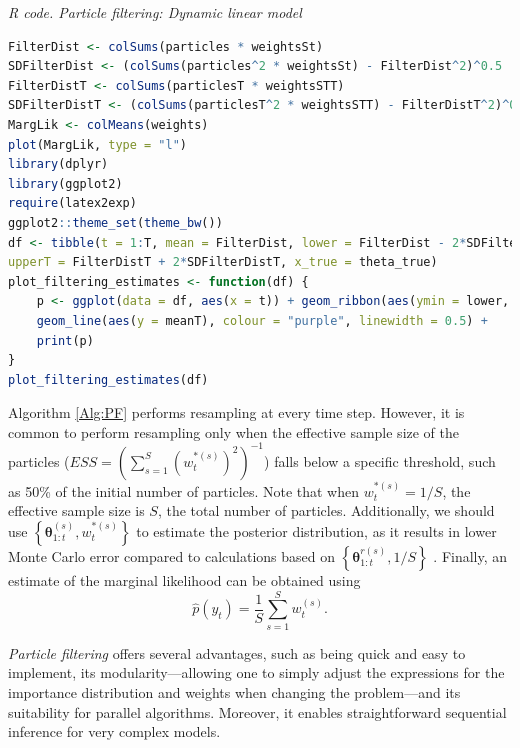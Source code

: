 \begin{tcolorbox}[enhanced,width=4.67in,center upper,
	fontupper=\large\bfseries,drop shadow southwest,sharp corners]
	\textit{R code. Particle filtering: Dynamic linear model}
	\begin{VF}
		\begin{lstlisting}[language=R]
FilterDist <- colSums(particles * weightsSt)
SDFilterDist <- (colSums(particles^2 * weightsSt) - FilterDist^2)^0.5
FilterDistT <- colSums(particlesT * weightsSTT)
SDFilterDistT <- (colSums(particlesT^2 * weightsSTT) - FilterDistT^2)^0.5
MargLik <- colMeans(weights)
plot(MargLik, type = "l")
library(dplyr)
library(ggplot2)
require(latex2exp)
ggplot2::theme_set(theme_bw())
df <- tibble(t = 1:T, mean = FilterDist, lower = FilterDist - 2*SDFilterDist, upper = FilterDist+ 2*SDFilterDist, meanT = FilterDistT, lowerT = FilterDistT - 2*SDFilterDistT,
upperT = FilterDistT + 2*SDFilterDistT, x_true = theta_true)
plot_filtering_estimates <- function(df) {
	p <- ggplot(data = df, aes(x = t)) + geom_ribbon(aes(ymin = lower, ymax = upper), alpha = 1, fill = "lightblue") + geom_line(aes(y = x_true), colour = "black", alpha = 1, linewidth = 0.5) + geom_line(aes(y = mean), colour = "blue", linewidth = 0.5) +
	geom_line(aes(y = meanT), colour = "purple", linewidth = 0.5) + 	ylab(TeX("$\\theta_{t}$")) + xlab("Time")
	print(p)
}
plot_filtering_estimates(df)
\end{lstlisting}
	\end{VF}
\end{tcolorbox} 

Algorithm \ref{Alg:PF} performs resampling at every time step. However, it is common to perform resampling only when the effective sample size of the particles ($ESS = (\sum_{s=1}^S (w_t^{*(s)})^{2})^{-1}$) falls below a specific threshold, such as 50\% of the initial number of particles. Note that when $w_t^{*(s)} = 1/S$, the effective sample size is $S$, the total number of particles. Additionally, we should use $\left\{\bm{\theta}_{1:t}^{(s)},w_t^{*(s)}\right\}$ to estimate the posterior distribution, as it results in lower Monte Carlo error compared to calculations based on $\left\{\bm{\theta}_{1:t}^{r(s)},1/S\right\}$ \cite{cappe2007overview}. Finally, an estimate of the marginal likelihood can be obtained using 
\[
\hat{p}(y_t) = \frac{1}{S}\sum_{s=1}^S w_t^{(s)}.
\]

\textit{Particle filtering} offers several advantages, such as being quick and easy to implement, its modularity—allowing one to simply adjust the expressions for the importance distribution and weights when changing the problem—and its suitability for parallel algorithms. Moreover, it enables straightforward sequential inference for very complex models.

